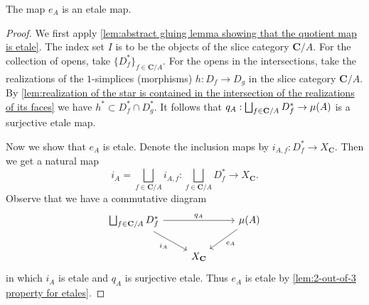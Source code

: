 \begin{proposition}
\label{prop:etale map of mu functor is indeed etale}
The map $e_A$ is an etale map.
\end{proposition}
\begin{proof}
We first apply \cref{lem:abstract gluing lemma showing that the quotient map is etale}. 
The index set $I$ is to be the objects of the slice category $\mathbf{C}/A$. For the collection of opens, take $\{D_f^*\}_{f \in \mathbf{C}/A}$. 
For the opens in the intersections, take the realizations of the $1$-simplices (morphisms) $h : D_f \to D_g$ in the slice category $\mathbf{C}/A$. By \cref{lem:realization of the star is contained in the intersection of the realizations of its faces} we have $h^* \subset D_f^* \cap D_g^*$. 
It follows that $q_A : \bigsqcup_{f \in \mathbf{C}/A} D_f^* \to \operatorname{\mu}(A)$ is a surjective etale map.

Now we show that $e_A$ is etale. Denote the inclusion maps by $i_{A,f} : D_f^* \to X_{\mathbf{C}}$. Then we get a natural map
\[ i_A = \bigsqcup_{f \in \mathbf{C}/A} i_{A,f} : \bigsqcup_{f \in \mathbf{C}/A} D_f^* \to X_{\mathbf{C}}. \]
Observe that we have a commutative diagram
\[ \begin{tikzcd}
\bigsqcup_{f \in \mathbf{C}/A} D_f^* \arrow{rr}{q_A} \arrow[swap]{dr}{i_A} & & \ST(A) \arrow{dl}{e_A} \\
& X_{\mathbf{C}} &
\end{tikzcd} \]
in which $i_A$ is etale and $q_A$ is surjective etale. Thus $e_A$ is etale by \cref{lem:2-out-of-3 property for etales}.
\end{proof}





